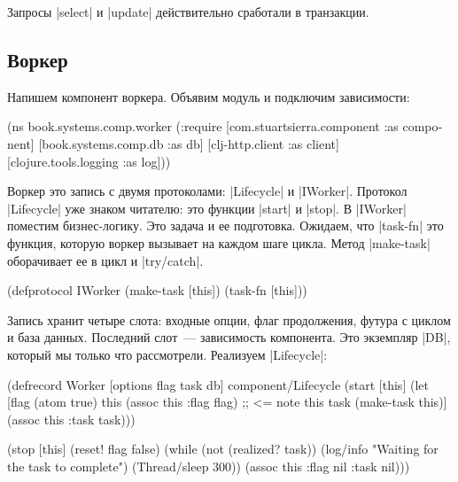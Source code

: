 Запросы \spverb|select| и \spverb|update| действительно сработали в транзакции.

\subsection{Воркер}

Напишем компонент воркера. Объявим модуль и подключим зависимости:

\begin{english}
  \begin{clojure}
(ns book.systems.comp.worker
  (:require
   [com.stuartsierra.component :as component]
   [book.systems.comp.db :as db]
   [clj-http.client :as client]
   [clojure.tools.logging :as log]))
  \end{clojure}
\end{english}

Воркер это запись с двумя протоколами: \spverb|Lifecycle| и
\spverb|IWorker|. Протокол \spverb|Lifecycle| уже знаком читателю: это функции
\spverb|start| и \spverb|stop|. В \spverb|IWorker| поместим бизнес-логику. Это
задача и ее подготовка. Ожидаем, что \spverb|task-fn| это функция, которую
воркер вызывает на каждом шаге цикла. Метод \spverb|make-task| оборачивает ее в
цикл и \spverb|try/catch|.

\begin{english}
  \begin{clojure}
(defprotocol IWorker
  (make-task [this])
  (task-fn [this]))
  \end{clojure}
\end{english}

Запись хранит четыре слота: входные опции, флаг продолжения, футура с циклом и
база данных. Последний слот~--- зависимость компонента. Это экземпляр
\spverb|DB|, который мы только что рассмотрели. Реализуем \spverb|Lifecycle|:

\begin{english}
  \begin{clojure}
(defrecord Worker
  [options flag task db]
  component/Lifecycle
  (start [this]
    (let [flag (atom true)
          this (assoc this :flag flag) ;; <= note this
          task (make-task this)]
      (assoc this :task task)))

  (stop [this]
    (reset! flag false)
    (while (not (realized? task))
      (log/info "Waiting for the task to complete")
      (Thread/sleep 300))
    (assoc this :flag nil :task nil)))
  \end{clojure}
\end{english}

